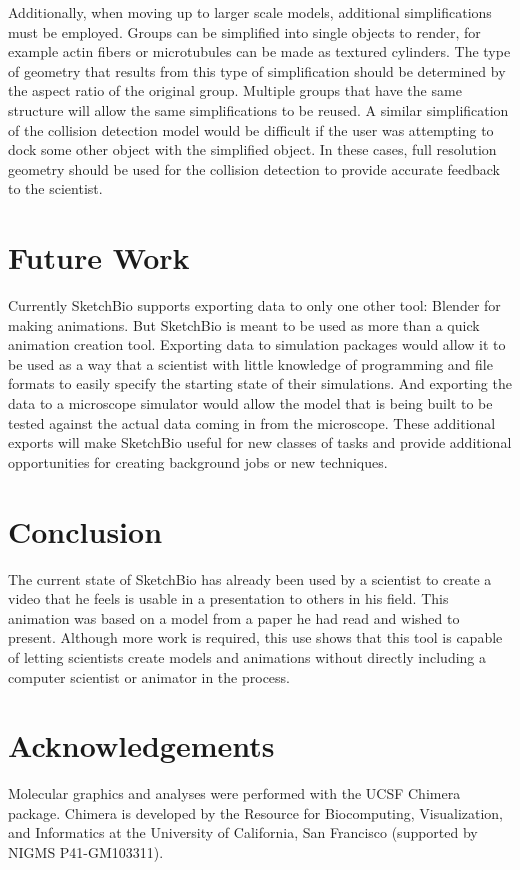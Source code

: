 \documentclass{article} %
\begin{document}
Additionally, when moving up to larger scale models, additional simplifications must be employed.  Groups can be simplified into single objects to render, for example actin fibers or microtubules can be made as textured cylinders.  The type of geometry that results from this type of simplification should be determined by the aspect ratio of the original group.  Multiple groups that have the same structure will allow the same simplifications to be reused.  A similar simplification of the collision detection model would be difficult if the user was attempting to dock some other object with the simplified object.  In these cases, full resolution geometry should be used for the collision detection to provide accurate feedback to the scientist.

\section{Future Work}
Currently SketchBio supports exporting data to only one other tool: Blender for making animations.  But SketchBio is meant to be used as more than a quick animation creation tool.  Exporting data to simulation packages would allow it to be used as a way that a scientist with little knowledge of programming and file formats to easily specify the starting state of their simulations.  And exporting the data to a microscope simulator would allow the model that is being built to be tested against the actual data coming in from the microscope.  These additional exports will make SketchBio useful for new classes of tasks and provide additional opportunities for creating background jobs or new techniques.

\section{Conclusion}
The current state of SketchBio has already been used by a scientist to create a video that he feels is usable in a presentation to others in his field.  This animation was based on a model from a paper he had read and wished to present.  Although more work is required, this use shows that this tool is capable of letting scientists create models and animations without directly including a computer scientist or animator in the process.

\section{Acknowledgements}
Molecular graphics and analyses were performed with the UCSF Chimera package. Chimera is developed by the Resource for Biocomputing, Visualization, and Informatics at the University of California, San Francisco (supported by NIGMS P41-GM103311).



\end{document}

